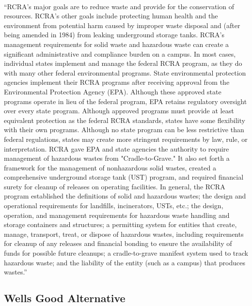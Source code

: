 \documentclass{article}
\begin{document}
\paragraph{}
``RCRA's major goals are to reduce waste and provide for the conservation of resources. RCRA's other goals include protecting human health and the environment from potential harm caused by improper waste disposal and (after being amended in 1984) from leaking underground storage tanks. RCRA's management requirements for solid waste and hazardous waste can create a significant administrative and compliance burden on a campus. In most cases, individual states implement and manage the federal RCRA program, as they do with many other federal environmental programs. State environmental protection agencies implement their RCRA programs after receiving approval from the Environmental Protection Agency (EPA). Although these approved state programs operate in lieu of the federal program, EPA retains regulatory oversight over every state program. Although approved programs must provide at least equivalent protection as the federal RCRA standards, states have some flexibility with their own programs. Although no state program can be less restrictive than federal regulations, states may create more stringent requirements by law, rule, or interpretation. RCRA gave EPA and state agencies the authority to require management of hazardous wastes from "Cradle-to-Grave." It also set forth a framework for the management of nonhazardous solid wastes, created a comprehensive underground storage tank (UST) program, and required financial surety for cleanup of releases on operating facilities. In general, the RCRA program established the definitions of solid and hazardous wastes; the design and operational requirements for landfills, incinerators, USTs, etc.; the design, operation, and management requirements for hazardous waste handling and storage containers and structures; a permitting system for entities that create, manage, transport, treat, or dispose of hazardous wastes, including requirements for cleanup of any releases and financial bonding to ensure the availability of funds for possible future cleanups; a cradle-to-grave manifest system used to track hazardous waste; and the liability of the entity (such as a campus) that produces wastes.”

\subsection{Wells Good Alternative}
\end{document}
